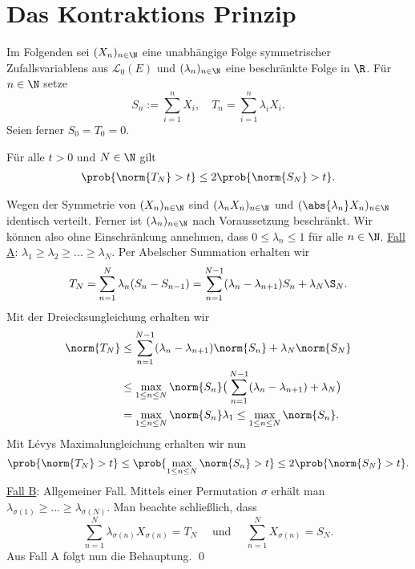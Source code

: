 \section{Das Kontraktions Prinzip}
Im Folgenden sei $(X_n)_{n \in \N}$ eine unabhängige Folge symmetrischer Zufallsvariablens aus $\mathcal{L}_0(E)$ und $(\lambda_n)_{n \in \N}$ eine beschränkte Folge in $\R$. 
Für $n \in \N$ setze
$$
    S_n := \sum_{i=1}^nX_i, \quad T_n = \sum_{i=1}^n\lambda_iX_i. 
$$
Seien ferner $S_0 = T_0 = 0$. 
\begin{lemma}
    Für alle $t > 0$ und $N \in \N$ gilt
    \begin{align}
        \prob{\norm{T_N} > t} \leq 2 \prob{\norm{S_N} > t}. 
    \end{align}
\end{lemma}

\begin{proof*}
    Wegen der Symmetrie von $(X_n)_{n \in \N}$ sind $(\lambda_n X_n)_{n \in \N}$ und $(\abs{\lambda_n}X_n)_{n \in \N}$ identisch verteilt. Ferner ist $(\lambda_n)_{n \in \N}$ nach Voraussetzung beschränkt. 
    Wir können also ohne Einschränkung annehmen, dass $0 \leq \lambda_n \leq 1$ für alle $n \in \N$. 
    \newline 
    \underline{Fall A}: $\lambda_1 \geq \lambda_2 \geq... \geq \lambda_N$. 
    \newline 
    Per Abelscher Summation erhalten wir 
    $$
        T_N = \sum_{n=1}^N \lambda_n(S_n - S_{n-1}) = \sum_{n=1}^{N-1}(\lambda_n - \lambda_{n+1})S_n + \lambda_N \S_N. 
    $$
    Mit der Dreiecksungleichung erhalten wir 
    \begin{align*}
        \norm{T_N} &\leq \sum_{n=1}^{N-1}(\lambda_n - \lambda_{n+1})\norm{S_n} + \lambda_N \norm{S_N} \\\
                   &\leq \max_{1 \leq n \leq N}\norm{S_n} \big(\sum_{n=1}^{N-1}(\lambda_n - \lambda_{n+1}) + \lambda_N\big) \\\
                   &= \max_{1\leq n \leq N}\norm{S_n} \lambda_1 \leq \max_{1\leq n \leq N}\norm{S_n}.
    \end{align*}
    Mit Lévys Maximalungleichung erhalten wir nun
    $$
        \prob{\norm{T_N} > t} \leq \prob{\max_{1 \leq n \leq N}\norm{S_n} > t} \leq 2 \prob{\norm{S_N} > t}.
    $$
    \underline{Fall B}: Allgemeiner Fall. 
    \newline 
    Mittels einer Permutation $\sigma$ erhält man $\lambda_{\sigma(1)} \geq ... \geq \lambda_{\sigma(N)}$. Man beachte schließlich, dass 
    $$
        \sum_{n=1}^N\lambda_{\sigma(n)}X_{\sigma(n)} = T_N \quad \text{ und } \quad \sum_{n=1}^N X_{\sigma(n)} = S_N.
    $$ 
    Aus Fall A folgt nun die Behauptung. \qed
\end{proof*}

